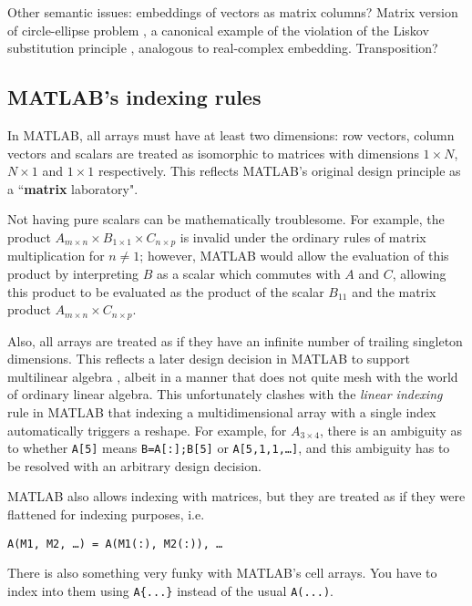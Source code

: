\documentclass[preprint]{sigplanconf}
\newcommand{\MATLAB}{\textsc{MATLAB}}
\begin{document}
Other semantic issues: embeddings of vectors as matrix columns? Matrix version
of circle-ellipse problem \cite{Halbert:1987ut}, a canonical example of the violation of the Liskov substitution principle \cite{Liskov:1987da}, analogous to real-complex embedding. Transposition?

\subsection{\MATLAB's indexing rules}

In \MATLAB, all arrays must have at least two dimensions: row vectors, column vectors and scalars are treated as isomorphic to matrices with dimensions $1\times N$, $N\times1$ and $1\times1$ respectively. This reflects \MATLAB's original design principle as a ``\textbf{matrix} laboratory".

Not having pure scalars can be mathematically troublesome. For example, the product $A_{m\times n} \times B_{1\times 1} \times C_{n\times p}$ is invalid under the ordinary rules of matrix multiplication for $n\ne1$; however, \MATLAB{} would allow the evaluation of this product by interpreting $B$ as a scalar which commutes with $A$ and $C$, allowing this product to be evaluated as the product of the scalar $B_{11}$ and the matrix product $A_{m\times n} \times C_{n\times p}$.


Also, all arrays are treated as if they have an infinite number of trailing singleton dimensions. This reflects a later design decision in \MATLAB{} to support multilinear algebra \cite{matlabman:ma},  albeit in a manner that does not quite mesh with the world of ordinary linear algebra. This unfortunately clashes with the \textit{linear indexing} rule in \MATLAB{} that indexing a multidimensional array with a single index automatically triggers a reshape. For example, for $A_{3\times4}$, there is an ambiguity as to whether \texttt{A[5]} means \texttt{B=A[:];B[5]} or \texttt{A[5,1,1,\dots]}, and this ambiguity has to be resolved with an arbitrary design decision.

\MATLAB{} also allows indexing with matrices, but they are treated as if they were flattened for indexing purposes, i.e.

\texttt{A(M1, M2, \dots) = A(M1(:), M2(:)), \dots}

There is also something very funky with \MATLAB's cell arrays. You have to index into them using \texttt{A\{...\}} instead of the usual \texttt{A(...)}.
\end{document}
